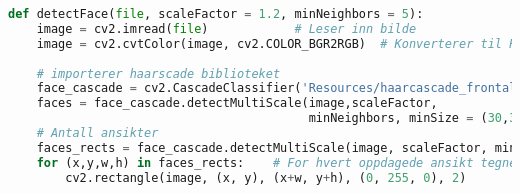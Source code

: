 \begin{lstlisting}[language=Python]
def detectFace(file, scaleFactor = 1.2, minNeighbors = 5):
    image = cv2.imread(file)            # Leser inn bilde
    image = cv2.cvtColor(image, cv2.COLOR_BGR2RGB)  # Konverterer til RGB
    
    # importerer haarscade biblioteket
    face_cascade = cv2.CascadeClassifier('Resources/haarcascade_frontalface_default.xml')
    faces = face_cascade.detectMultiScale(image,scaleFactor,
                                          minNeighbors, minSize = (30,30))
    # Antall ansikter                                      
    faces_rects = face_cascade.detectMultiScale(image, scaleFactor, minNeighbors)        
    for (x,y,w,h) in faces_rects:    # For hvert oppdagede ansikt tegner rektangel rundt
        cv2.rectangle(image, (x, y), (x+w, y+h), (0, 255, 0), 2)    
\end{lstlisting}